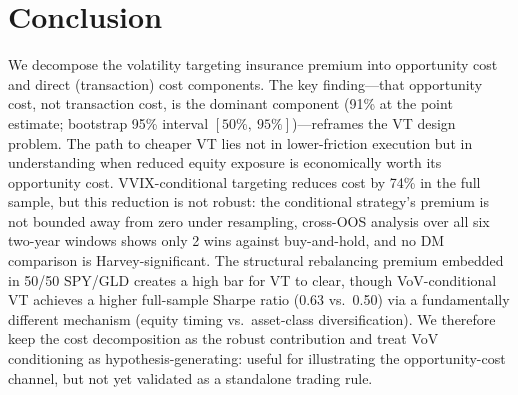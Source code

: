 \documentclass[12pt,a4paper]{article}
\begin{document}
\section{Conclusion}
\label{sec:conclusion}

We decompose the volatility targeting insurance premium into opportunity cost and direct (transaction) cost components. The key finding---that opportunity cost, not transaction cost, is the dominant component (91\% at the point estimate; bootstrap 95\% interval $[50\%,\ 95\%]$)---reframes the VT design problem. The path to cheaper VT lies not in lower-friction execution but in understanding when reduced equity exposure is economically worth its opportunity cost. VVIX-conditional targeting reduces cost by 74\% in the full sample, but this reduction is not robust: the conditional strategy's premium is not bounded away from zero under resampling, cross-OOS analysis over all six two-year windows shows only 2 wins against buy-and-hold, and no DM comparison is Harvey-significant. The structural rebalancing premium embedded in 50/50 SPY/GLD creates a high bar for VT to clear, though VoV-conditional VT achieves a higher full-sample Sharpe ratio (0.63 vs.\ 0.50) via a fundamentally different mechanism (equity timing vs.\ asset-class diversification). We therefore keep the cost decomposition as the robust contribution and treat VoV conditioning as hypothesis-generating: useful for illustrating the opportunity-cost channel, but not yet validated as a standalone trading rule.
\end{document}
